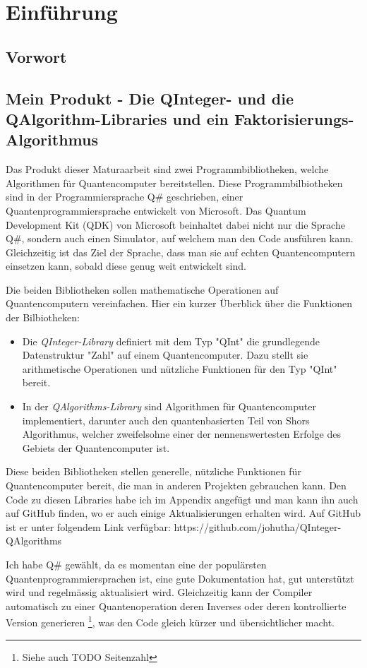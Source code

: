 \chapter{Einführung}
\section{Vorwort}
\section{Mein Produkt - Die QInteger- und die QAlgorithm-Libraries und ein Faktorisierungs-Algorithmus}
Das Produkt dieser Maturaarbeit sind zwei Programmbibliotheken, welche Algorithmen für Quantencomputer bereitstellen. Diese Programmbilbiotheken sind in der Programmiersprache Q\# geschrieben, einer Quantenprogrammiersprache entwickelt von Microsoft. Das Quantum Development Kit (QDK) von Microsoft beinhaltet dabei nicht nur die Sprache Q\#, sondern auch einen Simulator, auf welchem man den Code ausführen kann. Gleichzeitig ist das Ziel der Sprache, dass man sie auf echten Quantencomputern einsetzen kann, sobald diese genug weit entwickelt sind.

Die beiden Bibliotheken sollen mathematische Operationen auf Quantencomputern vereinfachen. Hier ein kurzer Überblick über die Funktionen der Bilbiotheken:
\begin{itemize}
    \item Die \textit{QInteger-Library} definiert mit dem Typ "QInt" die grundlegende Datenstruktur "Zahl" auf einem Quantencomputer. Dazu stellt sie arithmetische Operationen und nützliche Funktionen für den Typ "QInt" bereit.
    \item In der \textit{QAlgorithms-Library} sind Algorithmen für Quantencomputer implementiert, darunter auch den quantenbasierten Teil von Shors Algorithmus, welcher zweifelsohne einer der nennenswertesten Erfolge des Gebiets der Quantencomputer ist.
\end{itemize}
Diese beiden Bibliotheken stellen generelle, nützliche Funktionen für Quantencomputer bereit, die man in anderen Projekten gebrauchen kann. Den Code zu diesen Libraries habe ich im Appendix angefügt und man kann ihn auch auf GitHub finden, wo er auch einige Aktualisierungen erhalten wird. Auf GitHub ist er unter folgendem Link verfügbar: https://github.com/johutha/QInteger-QAlgorithms

Ich habe Q\# gewählt, da es momentan eine der populärsten Quantenprogrammiersprachen ist, eine gute Dokumentation hat, gut unterstützt wird und regelmässig aktualisiert wird. Gleichzeitig kann der Compiler automatisch zu einer Quantenoperation deren Inverses oder deren kontrollierte Version generieren \footnote{Siehe auch TODO Seitenzahl}, was den Code gleich kürzer und übersichtlicher macht.

